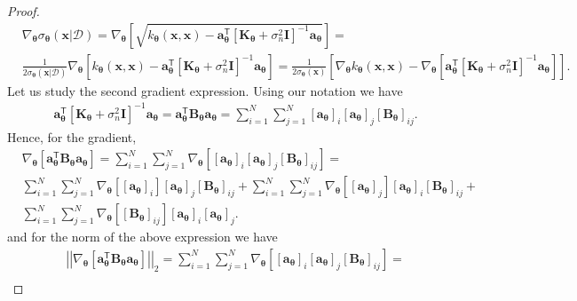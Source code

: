 \documentclass[jair,twoside,11pt,theapa]{article}
\theoremstyle{definition}
\begin{document}
\begin{proof}
\begin{align}
    &\nabla_{\bm{\theta}}\sigma_{\bm{\theta}}(\bm{x}|\mathcal{D}) = \nonumber
    \nabla_{\bm{\theta}}\left[\sqrt{k_{\bm{\theta}}(\boldsymbol{x}, \bm{x}) - \bm{a}_{\bm{\theta}}^{\mathsf{T}} [\bm{K}_{\bm{\theta}} + \sigma^{2}_{n} \textbf{I}]^{-1} \bm{a}_{\bm{\theta}}}\right] = \\\nonumber
    &\frac{1}{2\sigma_{\bm{\theta}}(\bm{x}|\mathcal{D})}\nabla_{\bm{\theta}}\left[k_{\bm{\theta}}(\bm{x}, \boldsymbol{x}) - \bm{a}_{\bm{\theta}}^{\mathsf{T}} [\bm{K}_{\bm{\theta}} + \sigma^{2}_{n} \textbf{I}]^{-1} \bm{a}_{\bm{\theta}}\right] = \nonumber
    \frac{1}{2\sigma_{\bm{\theta}}(\bm{x})}\left[\nabla_{\bm{\theta}}k_{\bm{\theta}}(\bm{x}, \bm{x}) - \nabla_{\bm{\theta}}\left[\bm{a}_{\bm{\theta}}^{\mathsf{T}} [\bm{K}_{\bm{\theta}} + \sigma^{2}_{n} \textbf{I}]^{-1} \bm{a}_{\bm{\theta}}\right]\right].
\end{align}
Let us study the second gradient expression. Using our notation we have
\begin{align*}
    &\bm{a}_{\bm{\theta}}^{\mathsf{T}} [\bm{K}_{\bm{\theta}} + \sigma^{2}_{n} \textbf{I}]^{-1} \bm{a}_{\bm{\theta}} = \nonumber
    \bm{a}^{\mathsf{T}}_{\bm{\theta}}\bm{B}_{\bm{\theta}}\bm{a}_{\bm{\theta}} =  \sum_{i=1}^N\sum_{j=1}^N[\bm{a}_{\bm{\theta}}]_i[\bm{a}_{\bm{\theta}}]_j\left[\bm{B}_{\bm{\theta}}\right]_{ij}.
\end{align*}
Hence, for the gradient,
\begin{align*}
    &\nabla_{\bm{\theta}}\left[\bm{a}^{\mathsf{T}}_{\bm{\theta}}\bm{B}_{\bm{\theta}}\bm{a}_{\bm{\theta}}\right] = \sum_{i=1}^N\sum_{j=1}^N\nabla_{\bm{\theta}}\left[[\bm{a}_{\bm{\theta}}]_i[\bm{a}_{\bm{\theta}}]_j\left[\bm{B}_{\bm{\theta}}\right]_{ij}\right] = \\\nonumber
    &\sum_{i=1}^N\sum_{j=1}^N\nabla_{\bm{\theta}}\left[[\bm{a}_{\bm{\theta}}]_i\right][\bm{a}_{\bm{\theta}}]_j\left[\bm{B}_{\bm{\theta}}\right]_{ij} + \nonumber
    \sum_{i=1}^N\sum_{j=1}^N\nabla_{\bm{\theta}}\left[[\bm{a}_{\bm{\theta}}]_j\right][\bm{a}_{\bm{\theta}}]_i\left[\bm{B}_{\bm{\theta}}\right]_{ij} + \\\nonumber
    &\sum_{i=1}^N\sum_{j=1}^N\nabla_{\bm{\theta}}\left[\left[\bm{B}_{\bm{\theta}}\right]_{ij}\right][\bm{a}_{\bm{\theta}}]_i[\bm{a}_{\bm{\theta}}]_j.
\end{align*}
and for the norm of the above expression we have
\begin{align*}
    &\left|\left|\nabla_{\bm{\theta}}\left[\bm{a}^{\mathsf{T}}_{\bm{\theta}}\bm{B}_{\bm{\theta}}\bm{a}_{\bm{\theta}}\right]\right|\right|_2 = \sum_{i=1}^N\sum_{j=1}^N\nabla_{\bm{\theta}}\left[[\bm{a}_{\bm{\theta}}]_i[\bm{a}_{\bm{\theta}}]_j\left[\bm{B}_{\bm{\theta}}\right]_{ij}\right] = \\\nonumber

\end{align*}
\end{proof}
\end{document}
